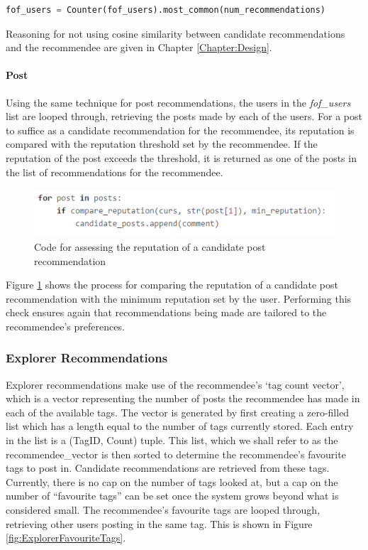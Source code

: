 \begin{lstlisting}[language=python]
	fof_users = Counter(fof_users).most_common(num_recommendations)
\end{lstlisting}

Reasoning for not using cosine similarity between candidate recommendations and the recommendee are given in Chapter \ref{Chapter:Design}.

\paragraph{Post} Using the same technique for post recommendations, the users in the \textit{fof\_users} list are looped through, retrieving the posts made by each of the  users. For a post to suffice as a candidate recommendation for the recommendee, its reputation is compared with the reputation threshold set by the recommendee. If the reputation of the post exceeds the threshold, it is returned as one of the posts in the list of recommendations for the recommendee.

\begin{figure}[H]
\centering
\includegraphics[height=0.7in]{Images/Implementation/FOFPostReputation}
\caption{Code for assessing the reputation of a candidate post recommendation}
\label{fig:FOFPostReputation}
\end{figure} 

\noindent Figure \ref{fig:FOFPostReputation} shows the process for comparing the reputation of a candidate post recommendation with the minimum reputation set by the user. Performing this check ensures again that recommendations being made are tailored to the recommendee's preferences.

\subsubsection{Explorer Recommendations}
Explorer recommendations make use of the recommendee's `tag count vector', which is a vector representing the number of posts the recommendee has made in each of the available tags. The vector is generated by first creating a zero-filled list which has a length equal to the number of tags currently stored. Each entry in the list is a (TagID, Count) tuple. This list, which we shall refer to as the recommendee\_vector is then sorted to determine the recommendee's favourite tags to post in. Candidate recommendations are retrieved from these tags. Currently, there is no cap on the number of tags looked at, but a cap on the number of ``favourite tags'' can be set once the system grows beyond what is considered small. The recommendee's favourite tags are looped through, retrieving other users posting in the same tag. This is shown in Figure \ref{fig:ExplorerFavouriteTags}.

